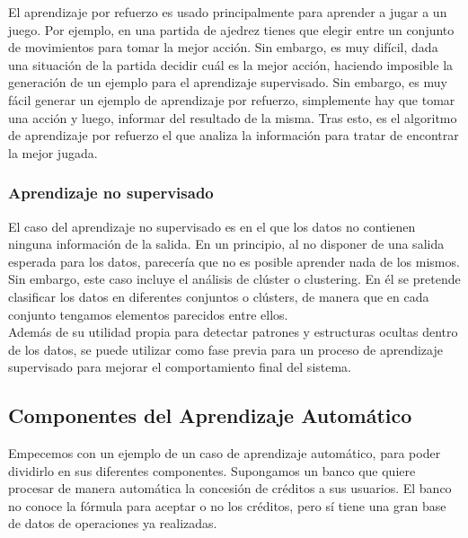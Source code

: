 El aprendizaje por refuerzo es usado principalmente para aprender a jugar a un juego. Por ejemplo, en una partida de ajedrez tienes que elegir entre un conjunto de movimientos para tomar la mejor acción. Sin embargo, es muy difícil, dada una situación de la partida decidir cuál es la mejor acción, haciendo imposible la generación de un ejemplo para el aprendizaje supervisado. Sin embargo, es muy fácil generar un ejemplo de aprendizaje por refuerzo, simplemente hay que tomar una acción y luego, informar del resultado de la misma. Tras esto, es el algoritmo de aprendizaje por refuerzo el que analiza la información para tratar de encontrar la mejor jugada.\\

\subsubsection{Aprendizaje no supervisado}

El caso del aprendizaje no supervisado es en el que los datos no contienen ninguna información de la salida. En un principio, al no disponer de una salida esperada para los datos, parecería que no es posible aprender nada de los mismos. Sin embargo, este caso incluye el análisis de clúster o clustering. En él se pretende clasificar los datos en diferentes conjuntos o clústers, de manera que en cada conjunto tengamos elementos parecidos entre ellos.\\

Además de su utilidad propia para detectar patrones y estructuras ocultas dentro de los datos, se puede utilizar como fase previa para un proceso de aprendizaje supervisado  para mejorar el comportamiento final del sistema.\\

\subsection{Componentes del Aprendizaje Automático}

Empecemos con un ejemplo de un caso de aprendizaje automático, para poder dividirlo en sus diferentes componentes. Supongamos un banco que quiere procesar de manera automática la concesión de créditos a sus usuarios. El banco no conoce la fórmula para aceptar o no los créditos, pero sí tiene una gran base de datos de operaciones ya realizadas.\\

